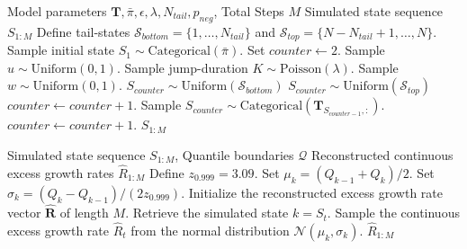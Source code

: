 \begin{algorithm}[htpb]
\caption{Hybrid jump-diffusion simulation with persistent volatility}
\label{alg:sim}
\begin{algorithmic}[1]
\REQUIRE Model parameters $\mathbf{T}, \bar{\pi}, \epsilon, \lambda, N_{tail}, p_{neg}$, Total Steps $M$
\ENSURE Simulated state sequence $S_{1:M}$
\STATE Define tail-states $\mathcal{S}_{bottom} = \{1, \dots, N_{tail}\}$ and $\mathcal{S}_{top} = \{N-N_{tail}+1, \dots, N\}$.
\STATE Sample initial state $S_1 \sim \text{Categorical}(\bar{\pi})$.
\STATE Set $counter \leftarrow 2$.
    \STATE Sample $u \sim \text{Uniform}(0, 1)$.
        \STATE Sample jump-duration $K \sim \text{Poisson}(\lambda)$.
            \STATE Sample $w \sim \text{Uniform}(0, 1)$.
                \STATE $S_{counter} \sim \text{Uniform}(\mathcal{S}_{bottom})$ 
            \ELSE
                \STATE $S_{counter} \sim \text{Uniform}(\mathcal{S}_{top})$
            \ENDIF
            \STATE $counter \leftarrow counter + 1$.
        \ENDFOR
    \ELSE
        \STATE Sample $S_{counter} \sim \text{Categorical}(\mathbf{T}_{S_{counter-1}, :})$.
        \STATE $counter \leftarrow counter + 1$.
    \ENDIF
\ENDWHILE
\RETURN $S_{1:M}$
\end{algorithmic}
\end{algorithm}

\clearpage

\begin{algorithm}[htpb]
\caption{State decoding and continuous excess growth rate reconstruction}
\label{alg:decode}
\begin{algorithmic}[1]
\REQUIRE Simulated state sequence $S_{1:M}$, Quantile boundaries $\mathcal{Q}$
\ENSURE Reconstructed continuous excess growth rates $\hat{R}_{1:M}$
\STATE Define $z_{0.999} = 3.09$.
    \STATE Set $\mu_k = (Q_{k-1} + Q_k)/2$.
    \STATE Set $\sigma_k = (Q_k - Q_{k-1})/(2 z_{0.999})$.
\ENDFOR
\STATE Initialize the reconstructed excess growth rate vector $\mathbf{\hat{R}}$ of length $M$.
    \STATE Retrieve the simulated state $k = S_t$.
\STATE Sample the continuous excess growth rate $\hat{R}_t$ from the normal distribution $\mathcal{N}(\mu_k, \sigma_k)$.
\ENDFOR
\RETURN $\hat{R}_{1:M}$
\end{algorithmic}
\end{algorithm}

